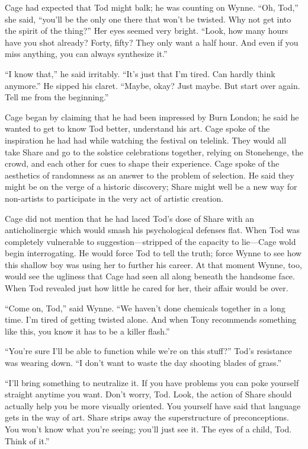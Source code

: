 Cage had expected that Tod might balk; he was counting on Wynne. ``Oh, Tod,'' she said, ``you'll be the only one there that won't be twisted. Why not get into the spirit of the thing?'' Her eyes seemed very bright. ``Look, how many hours have you shot already? Forty, fifty? They only want a half hour. And even if you miss anything, you can always synthesize it.''

``I know that,'' he said irritably. ``It's just that I'm tired. Can hardly think anymore.'' He sipped his claret. ``Maybe, okay? Just maybe. But start over again. Tell me from the beginning.''

Cage began by claiming that he had been impressed by Burn London; he said he wanted to get to know Tod better, understand his art. Cage spoke of the inspiration he had had while watching the festival on telelink. They would all take Share and go to the solstice celebrations together, relying on Stonehenge, the crowd, and each other for cues to shape their experience. Cage spoke of the aesthetics of randomness as an answer to the problem of selection. He said they might be on the verge of a historic discovery; Share might well be a new way for non-artists to participate in the very act of artistic creation.

Cage did not mention that he had laced Tod's dose of Share with an anticholinergic which would smash his psychological defenses flat. When Tod was completely vulnerable to suggestion---stripped of the capacity to lie---Cage wold begin interrogating. He would force Tod to tell the truth; force Wynne to see how this shallow boy was using her to further his career. At that moment Wynne, too, would see the ugliness that Cage had seen all along beneath the handsome face. When Tod revealed just how little he cared for her, their affair would be over.

``Come on, Tod,'' said Wynne. ``We haven't done chemicals together in a long time. I'm tired of getting twisted alone. And when Tony recommends something like this, you know it has to be a killer flash.''

``You're sure I'll be able to function while we're on this stuff?'' Tod's resistance was wearing down. ``I don't want to waste the day shooting blades of grass.''

``I'll bring something to neutralize it. If you have problems you can poke yourself straight anytime you want. Don't worry, Tod. Look, the action of Share should actually help you be more visually oriented. You yourself have said that language gets in the way of art. Share strips away the superstructure of preconceptions. You won't know what you're seeing; you'll just see it. The eyes of a child, Tod. Think of it.''

